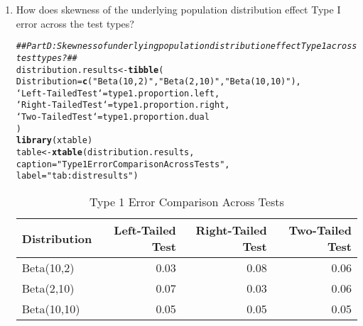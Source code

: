 \documentclass{article}\usepackage[]{graphicx}\usepackage[]{xcolor}
\makeatletter
\newcommand{\hlsng}[1]{\textcolor[rgb]{0.192,0.494,0.8}{#1}}%
\newcommand{\hlcom}[1]{\textcolor[rgb]{0.678,0.584,0.686}{\textit{#1}}}%
\newcommand{\hldef}[1]{\textcolor[rgb]{0.345,0.345,0.345}{#1}}%
\newcommand{\hlkwb}[1]{\textcolor[rgb]{0.69,0.353,0.396}{#1}}%
\newcommand{\hlkwc}[1]{\textcolor[rgb]{0.333,0.667,0.333}{#1}}%
\newcommand{\hlkwd}[1]{\textcolor[rgb]{0.737,0.353,0.396}{\textbf{#1}}}%
\newenvironment{kframe}{%
 \def\at@end@of@kframe{}%
 \ifinner\ifhmode%
  \def\at@end@of@kframe{\end{minipage}}%
  \begin{minipage}{\columnwidth}%
 \fi\fi%
 \def\FrameCommand##1{\hskip\@totalleftmargin \hskip-\fboxsep
 \colorbox{shadecolor}{##1}\hskip-\fboxsep
     \hskip-\linewidth \hskip-\@totalleftmargin \hskip\columnwidth}%
 \MakeFramed {\advance\hsize-\width
   \@totalleftmargin\z@ \linewidth\hsize
   \@setminipage}}%
 {\par\unskip\endMakeFramed%
 \at@end@of@kframe}
\newenvironment{knitrout}{}{} %
\makeatother
\begin{document}
\begin{enumerate}
\begin{enumerate}
    \item How does skewness of the underlying population distribution effect
    Type I error across the test types?
\begin{knitrout}
\color{fgcolor}\begin{kframe}
\begin{alltt}
\hlcom{## Part D: Skewness of underlying population distribution effect Type 1 across test types? ##}
\hldef{distribution.results} \hlkwb{<-} \hlkwd{tibble}\hldef{(}
  \hlkwc{Distribution} \hldef{=} \hlkwd{c}\hldef{(}\hlsng{"Beta(10,2)"}\hldef{,} \hlsng{"Beta(2,10)"}\hldef{,} \hlsng{"Beta(10,10)"}\hldef{),}
  \hlkwc{`Left-Tailed Test`} \hldef{= type1.proportion.left,}
  \hlkwc{`Right-Tailed Test`} \hldef{= type1.proportion.right,}
  \hlkwc{`Two-Tailed Test`} \hldef{= type1.proportion.dual}
\hldef{)}
\hlkwd{library}\hldef{(xtable)}
\hldef{table} \hlkwb{<-} \hlkwd{xtable}\hldef{(distribution.results,}
                \hlkwc{caption} \hldef{=} \hlsng{"Type 1 Error Comparison Across Tests"}\hldef{,}
                \hlkwc{label} \hldef{=} \hlsng{"tab:distresults"}\hldef{)}
\end{alltt}
\end{kframe}
\end{knitrout}
\begin{table}[H]
\centering
\begingroup\small
\begin{tabular}{lrrr}
  \hline
Distribution & Left-Tailed Test & Right-Tailed Test & Two-Tailed Test \\ 
  \hline
Beta(10,2) & 0.03 & 0.08 & 0.06 \\ 
  Beta(2,10) & 0.07 & 0.03 & 0.06 \\ 
  Beta(10,10) & 0.05 & 0.05 & 0.05 \\ 
   \hline
\end{tabular}
\endgroup
\caption{Type 1 Error Comparison Across Tests} 
\label{tab:distresults}
\end{table}

  \end{enumerate}
\end{enumerate}

\end{document}
